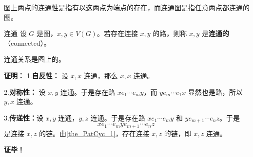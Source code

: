 图上两点的连通性是指有以这两点为端点的存在，而连通图是指任意两点都连通的图。

\begin{definition}{连通}
设 $G$ 是图，$x,y\in V(G)$。若存在连接 $x,y$ 的路，则称 $x,y$ 是\textbf{连通的}（connected）。
\end{definition}

\begin{theorem}{}
连通关系是图上的。
\end{theorem}
\textbf{证明：}
1.\textbf{自反性：} 设 $x,x$ 连通，那么 $x,x$ 连通。

2.\textbf{对称性：} 设 $x,y$ 连通。于是存在路 $xe_1\cdots e_m y$，而 $ye_m\cdots e_1 x$ 显然也是路，所以 $y,x$ 连通。

3.\textbf{传递性：}设 $x,y$ 连通，$y,z$ 连通。于是存在路 $xe_1\cdots e_m y$ 和 $ye_{m+1}\cdots e_{n}z$。于是
\begin{equation}
xe_1\cdots e_m ye_{m+1}\cdots e_{n}z~
\end{equation}
是连接 $x,z$ 的链。由\autoref{the_PatCyc_1}，存在连接 $x,z$ 的链，即 $x,z$ 连通。

\textbf{证毕！}

\











